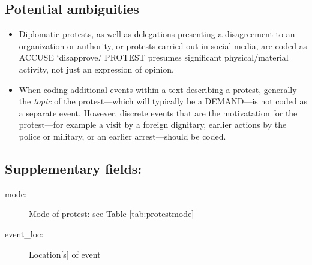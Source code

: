\documentclass[11pt]{report}
\newcommand{\plcat}[1]{\textsf{#1}}
\begin{document}
\subsection{Potential ambiguities}

\begin{itemize}
\item Diplomatic protests, as well as delegations presenting a disagreement to an organization or authority, or protests carried out in social media, are coded as  \plcat{ACCUSE} `disapprove.'  \plcat{PROTEST} presumes significant physical/material activity, not just an expression of opinion.
\item When coding additional events within a text describing a protest, generally the \textit{topic} of the protest---which will typically be a DEMAND---is not coded as a separate event. However, discrete events that are the motivatation for the protest---for example a visit by a foreign dignitary, earlier actions by the police or military, or an earlier arrest---should be coded.
\end{itemize}

\subsection{Supplementary fields:}

\begin{description}
	\item[mode:] Mode of protest: see Table \ref{tab:protestmode}
	\item[event\_loc:] Location[s] of event
\end{description}

\end{document}
